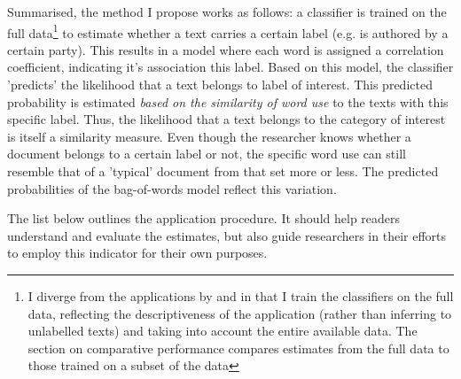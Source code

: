 \documentclass{article}
\begin{document}
Summarised, the method I propose works as follows: a classifier is trained on the full data\footnote{I diverge from the applications by \cite{Peterson2018} and \cite{Goet2019} in that I train the classifiers on the full data, reflecting the descriptiveness of the application (rather than inferring to unlabelled texts) and taking into account the entire available data. The section on comparative performance compares estimates from the full data to those trained on a subset of the data} to estimate whether a text carries a certain label (e.g. is authored by a certain party). This results in a model where each word is assigned a correlation coefficient, indicating it's association this label. Based on this model, the classifier 'predicts' the likelihood that a text belongs to label of interest. This predicted probability is estimated \textit{based on the similarity of word use} to the texts with this specific label. Thus, the likelihood that a text belongs to the category of interest is itself a similarity measure. Even though the researcher knows whether a document belongs to a certain label or not, the specific word use can still resemble that of a 'typical' document from that set more or less. The predicted probabilities of the bag-of-words model reflect this variation. \par

The list below outlines the application procedure. It should help readers understand and evaluate the estimates, but also guide researchers in their efforts to employ this indicator for their own purposes. \medskip
\end{document}
